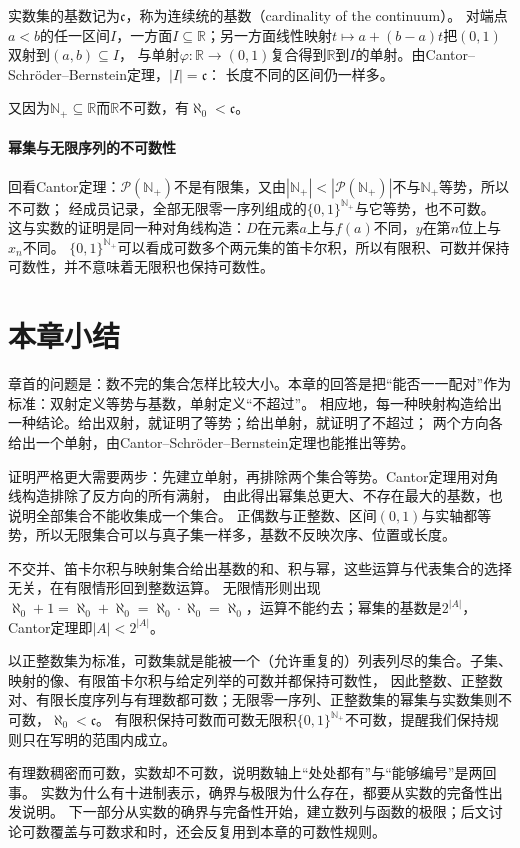 实数集的基数记为$\mathfrak c$，称为连续统的基数（cardinality of the continuum）。
对端点$a<b$的任一区间$I$，一方面$I\subseteq\mathbb R$；另一方面线性映射$t\mapsto a+(b-a)t$把$(0,1)$双射到$(a,b)\subseteq I$，
与单射$\varphi:\mathbb R\to(0,1)$复合得到$\mathbb R$到$I$的单射。由Cantor--Schröder--Bernstein定理，$|I|=\mathfrak c$：
长度不同的区间仍一样多。

又因为$\mathbb N_+\subseteq\mathbb R$而$\mathbb R$不可数，有$\aleph_0<\mathfrak c$。

\paragraph{幂集与无限序列的不可数性}
\label{sec:comb-uncountable-power-set}
回看Cantor定理：$\mathcal P(\mathbb N_+)$不是有限集，又由$|\mathbb N_+|<|\mathcal P(\mathbb N_+)|$不与$\mathbb N_+$等势，所以不可数；
经成员记录，全部无限零一序列组成的$\{0,1\}^{\mathbb N_+}$与它等势，也不可数。
这与实数的证明是同一种对角线构造：$D$在元素$a$上与$f(a)$不同，$y$在第$n$位上与$x_n$不同。
$\{0,1\}^{\mathbb N_+}$可以看成可数多个两元集的笛卡尔积，所以有限积、可数并保持可数性，并不意味着无限积也保持可数性。

\section{本章小结}
\label{sec:cardinality-summary}

章首的问题是：数不完的集合怎样比较大小。本章的回答是把“能否一一配对”作为标准：双射定义等势与基数，单射定义“不超过”。
相应地，每一种映射构造给出一种结论。给出双射，就证明了等势；给出单射，就证明了不超过；
两个方向各给出一个单射，由Cantor--Schröder--Bernstein定理也能推出等势。

证明严格更大需要两步：先建立单射，再排除两个集合等势。Cantor定理用对角线构造排除了反方向的所有满射，
由此得出幂集总更大、不存在最大的基数，也说明全部集合不能收集成一个集合。
正偶数与正整数、区间$(0,1)$与实轴都等势，所以无限集合可以与真子集一样多，基数不反映次序、位置或长度。

不交并、笛卡尔积与映射集合给出基数的和、积与幂，这些运算与代表集合的选择无关，在有限情形回到整数运算。
无限情形则出现$\aleph_0+1=\aleph_0+\aleph_0=\aleph_0\cdot\aleph_0=\aleph_0$，运算不能约去；幂集的基数是$2^{|A|}$，Cantor定理即$|A|<2^{|A|}$。

以正整数集为标准，可数集就是能被一个（允许重复的）列表列尽的集合。子集、映射的像、有限笛卡尔积与给定列举的可数并都保持可数性，
因此整数、正整数对、有限长度序列与有理数都可数；无限零一序列、正整数集的幂集与实数集则不可数，$\aleph_0<\mathfrak c$。
有限积保持可数而可数无限积$\{0,1\}^{\mathbb N_+}$不可数，提醒我们保持规则只在写明的范围内成立。

有理数稠密而可数，实数却不可数，说明数轴上“处处都有”与“能够编号”是两回事。
实数为什么有十进制表示，确界与极限为什么存在，都要从实数的完备性出发说明。
下一部分从实数的确界与完备性开始，建立数列与函数的极限；后文讨论可数覆盖与可数求和时，还会反复用到本章的可数性规则。
